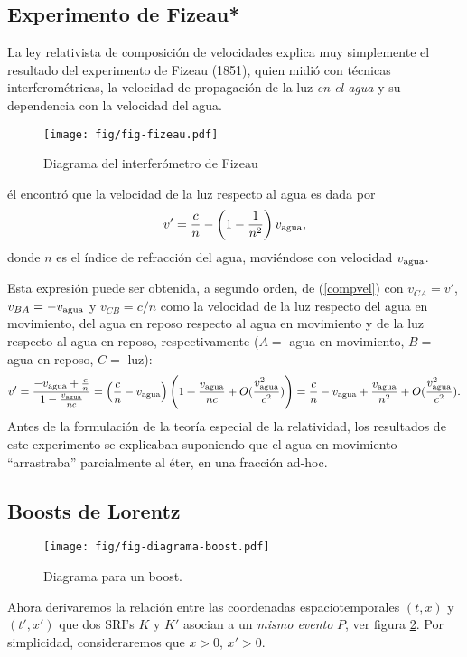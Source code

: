 \subsection{Experimento de Fizeau*}
La ley relativista de composición de velocidades explica muy simplemente el
resultado del experimento de Fizeau (1851), quien midió con técnicas
interferométricas, la velocidad de propagación de la luz \textit{en el agua}
y su dependencia con la velocidad del agua.
\begin{figure}[!h]
\centerline{\texttt{[image: fig/fig-fizeau.pdf]}}
 \caption{Diagrama del interferómetro de Fizeau}
\label{fizeau}
\end{figure}
él encontró que la velocidad de la luz respecto al agua es dada por
\begin{equation}
v'=\frac{c}{n}-\left(1-\frac{1}{n^2}\right)v_{\rm agua} ,
\end{equation}
donde $n$ es el índice de refracción del agua, moviéndose con velocidad $v_{\rm agua}$.

Esta expresión puede ser obtenida, a segundo orden, de (\ref{compvel}) con
$v_{CA}=v'$, $v_{BA}=-v_{\rm agua}$ y $v_{CB}=c/n$ como la velocidad de la luz
respecto del agua en movimiento, del agua en reposo respecto al agua en
movimiento y de la luz respecto al agua en reposo, respectivamente ($A=$ agua
en movimiento, $B=$ agua en reposo, $C=$ luz):
\begin{equation}
v'=\frac{-v_{\rm agua}+\frac{c}{n}}{1-\frac{v_{\rm
agua}}{nc}}=\left(\frac{c}{n}-v_{\rm agua}\right)\left(1+\frac{v_{\rm
agua}}{nc}+O(\frac{v_{\rm agua}^2}{c^2})\right)=\frac{c}{n}-v_{\rm
agua}+\frac{v_{\rm agua}}{n^2}+O(\frac{v_{\rm
agua}^2}{c^2}).
\end{equation}
Antes de la formulación de la teoría especial de la relatividad, los
resultados de este experimento se explicaban suponiendo que el agua en movimiento
``arrastraba'' parcialmente al éter, en una fracción ad-hoc.


\subsection{Boosts de Lorentz} \label{secboostx}
\begin{figure}[!h]
\centerline{\texttt{[image: fig/fig-diagrama-boost.pdf]}}
 \caption{Diagrama para un boost.}
\label{boo}
\end{figure}
Ahora derivaremos la relación entre las coordenadas espaciotemporales $(t,x)$
y $(t',x')$ que dos SRI's $K$ y $K'$ asocian a un \textit{mismo evento} $P$, ver figura \ref{boo}. Por simplicidad, consideraremos que $x>0$, $x'>0$.

